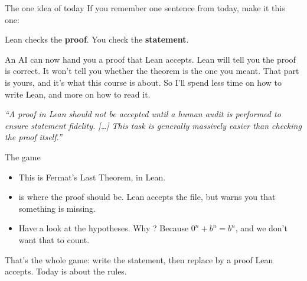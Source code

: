 \documentclass[10pt, aspectratio=169]{beamer}
\begin{document}
\begin{frame}[fragile]{The one idea of today}
If you remember one sentence from today, make it this one:

\vspace{0.4em}
\begin{keypoint}
Lean checks the \textbf{proof}. You check the \textbf{statement}.
\end{keypoint}

\vspace{0.6em}
An AI can now hand you a proof that Lean accepts. Lean will tell you the proof is correct. It won't tell you whether the theorem is the one you meant. That part is yours, and it's what this course is about. So I'll spend less time on how to write Lean, and more on how to read it.

\vspace{0.6em}
\begin{paper}
\itshape ``A proof in Lean should not be accepted until a human audit is performed to ensure statement fidelity. [\dots] This task is generally massively easier than checking the proof itself.''
\end{paper}
\end{frame}

\begin{frame}[fragile]{The game}
\begin{center}
\begin{minipage}{0.65\textwidth}
\end{minipage}
\end{center}

\begin{itemize}
\item This is Fermat's Last Theorem, in Lean.
\item {} is where the proof should be. Lean accepts the file, but warns you that something is missing.
\item Have a look at the hypotheses. Why ? Because $0^n + b^n = b^n$, and we don't want that to count.
\end{itemize}

\vspace{0.4em}
\begin{keypoint}
\normalsize That's the whole game: write the statement, then replace  by a proof Lean accepts. Today is about the rules.
\end{keypoint}
\end{frame}
\end{document}
